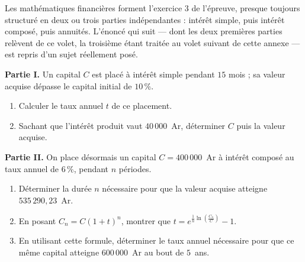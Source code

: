 \begin{annales}
Les mathématiques financières forment l'exercice 3 de l'épreuve, presque
toujours structuré en deux ou trois parties indépendantes : intérêt simple,
puis intérêt composé, puis annuités. L'énoncé qui suit — dont les deux
premières parties relèvent de ce volet, la troisième étant traitée au volet
suivant de cette annexe — est repris d'un sujet réellement posé.

\textbf{Partie I.} Un capital $C$ est placé à intérêt simple pendant
$15$ mois ; sa valeur acquise dépasse le capital initial de $10\,\%$.
\begin{enumerate}[label=\textbf{\alph*)}, leftmargin=*, itemsep=0.15em]
  \item Calculer le taux annuel $t$ de ce placement.
  \item Sachant que l'intérêt produit vaut $40\,000$~Ar, déterminer $C$ puis
        la valeur acquise.
\end{enumerate}

\textbf{Partie II.} On place désormais un capital $C = 400\,000$~Ar à
intérêt composé au taux annuel de $6\,\%$, pendant $n$ périodes.
\begin{enumerate}[label=\textbf{\alph*)}, leftmargin=*, itemsep=0.15em]
  \item Déterminer la durée $n$ nécessaire pour que la valeur acquise atteigne
        $535\,290{,}23$~Ar.
  \item En posant $C_{n} = C(1+t)^{n}$, montrer que
        $t = e^{\frac1n\ln\left(\frac{C_{n}}{C}\right)}-1$.
  \item En utilisant cette formule, déterminer le taux annuel nécessaire
        pour que ce même capital atteigne $600\,000$~Ar au bout de $5$~ans.
\end{enumerate}
\end{annales}

